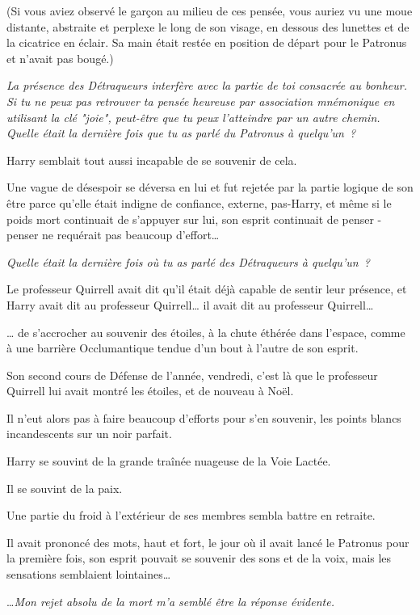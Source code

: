 (Si vous aviez observé le garçon au milieu de ces pensée, vous auriez vu une moue distante, abstraite et perplexe le long de son visage, en dessous des lunettes et de la cicatrice en éclair. Sa main était restée en position de départ pour le Patronus et n'avait pas bougé.)

\emph{La présence des Détraqueurs interfère avec la partie de toi consacrée au bonheur. Si tu ne peux pas retrouver ta pensée heureuse par association mnémonique en utilisant la clé "joie", peut-être que tu peux l'atteindre par un autre chemin. Quelle était la dernière fois que tu as parlé du Patronus à quelqu'un~?}

Harry semblait tout aussi incapable de se souvenir de cela.

Une vague de désespoir se déversa en lui et fut rejetée par la partie logique de son être parce qu'elle était indigne de confiance, externe, pas-Harry, et même si le poids mort continuait de s'appuyer sur lui, son esprit continuait de penser - penser ne requérait pas beaucoup d'effort…

\emph{Quelle était la dernière fois où tu as parlé des Détraqueurs à quelqu'un~?}

Le professeur Quirrell avait dit qu'il était déjà capable de sentir leur présence, et Harry avait dit au professeur Quirrell… il avait dit au professeur Quirrell…

… de s'accrocher au souvenir des étoiles, à la chute éthérée dans l'espace, comme à une barrière Occlumantique tendue d'un bout à l'autre de son esprit.

Son second cours de Défense de l'année, vendredi, c'est là que le professeur Quirrell lui avait montré les étoiles, et de nouveau à Noël.

Il n'eut alors pas à faire beaucoup d'efforts pour s'en souvenir, les points blancs incandescents sur un noir parfait.

Harry se souvint de la grande traînée nuageuse de la Voie Lactée.

Il se souvint de la paix.

Une partie du froid à l'extérieur de ses membres sembla battre en retraite.

Il avait prononcé des mots, haut et fort, le jour où il avait lancé le Patronus pour la première fois, son esprit pouvait se souvenir des sons et de la voix, mais les sensations semblaient lointaines…

…\emph{Mon rejet absolu de la mort m'a semblé être la réponse évidente.}

